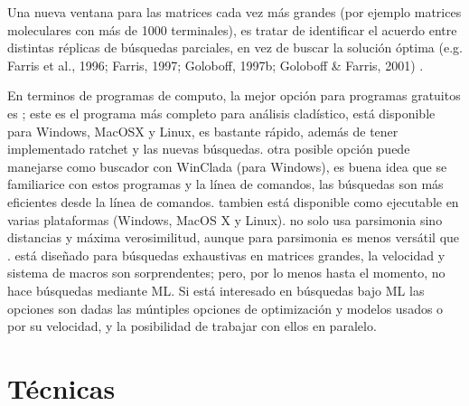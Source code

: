 Una nueva ventana para las matrices cada vez m\'as grandes (por ejemplo matrices moleculares con m\'as de 1000 terminales),  es tratar de identificar el acuerdo entre distintas r\'eplicas de b\'usquedas parciales,  en vez de buscar la soluci\'on \'optima {\color{red}(e.g. Farris et al.,  1996; Farris,  1997; Goloboff,  1997b; Goloboff \& Farris,  2001) \cite{Farris1996} \cite{Goloboff1997} \cite{Goloboff2001}}. 

En terminos de programas de computo,  la mejor opci\'on para programas gratuitos es ; este es el programa m\'as  completo para an\'alisis clad\'istico, est\'a disponible para Windows, MacOSX y Linux, es bastante r\'apido, adem\'as de tener implementado ratchet y las nuevas b\'usquedas.   otra posible opci\'on puede manejarse como buscador con WinClada (para Windows),  es buena idea que se familiarice con estos programas y la l\'inea de comandos, las b\'usquedas son m\'as eficientes desde la l\'inea de comandos.   tambien est\'a disponible como ejecutable en varias plataformas (Windows, MacOS X y Linux).    no solo usa parsimonia sino distancias y m\'axima verosimilitud, aunque para parsimonia es menos vers\'atil que .   est\'a dise\~nado para b\'usquedas exhaustivas en matrices grandes, la velocidad y sistema de macros son sorprendentes; pero, por lo menos hasta el momento, no hace b\'usquedas mediante ML. Si est\'a interesado en b\'usquedas bajo ML las opciones son  dadas las m\'untiples opciones de optimizaci\'on y modelos usados o  por su velocidad, y la posibilidad de trabajar con ellos en paralelo.




\section*{T\'ecnicas}

